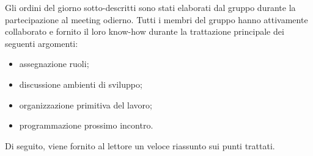 Gli ordini del giorno sotto-descritti sono stati
elaborati dal gruppo durante la partecipazione al meeting odierno. Tutti i membri del gruppo hanno attivamente collaborato e fornito il loro know-how durante
la trattazione principale dei seguenti argomenti:
\begin{itemize}
    \item assegnazione ruoli;
    \item discussione ambienti di sviluppo;
    \item organizzazione primitiva del lavoro;
    \item programmazione prossimo incontro.
\end{itemize}
Di seguito, viene fornito al lettore un veloce riassunto sui punti trattati.